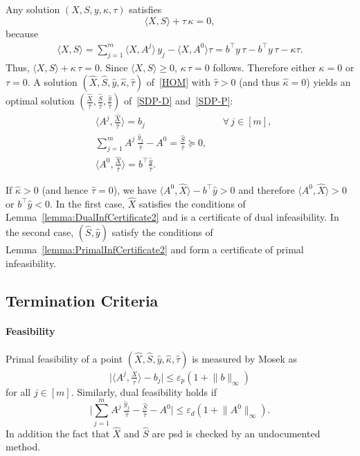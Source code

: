 \documentclass[10pt, a4paper]{article}
\newcommand{\abs}[1]{\lvert{#1}\rvert}
\newcommand{\norm}[1]{\lVert{#1}\rVert}
\newcommand{\skal}[2]{\langle{#1},{#2}\rangle}
\newcommand{\T}{^{\top}}
\begin{document}
Any solution $(X,S,y,\kappa,\tau)$ satisfies
\[
\skal{X}{S} + \tau\, \kappa = 0,
\]
because
\begin{align*}
  \skal{X}{S} = \sum_{j=1}^m \skal{X}{A^j}\, y_j - \skal{X}{A^0} \tau = b\T y\,\tau - b\T y\,\tau - \kappa \tau.
\end{align*}
Thus, $\skal{X}{S} + \kappa\, \tau = 0$. Since $\skal{X}{S} \geq 0$,
$\kappa \, \tau = 0$ follows. Therefore either $\kappa = 0$ or $\tau = 0$.
A solution $(\hat{X},\hat{S},\hat{y},\hat{\kappa},\hat{\tau})$
of~\eqref{HOM} with $\hat{\tau} > 0$ (and thus $\hat{\kappa} = 0$) yields
an optimal solution
$(\frac{\hat{X}}{\hat{\tau}}, \frac{\hat{S}}{\hat{\tau}},
\frac{\hat{y}}{\hat{\tau}})$ of~\eqref{SDP-D} and~\eqref{SDP-P}:
\begin{align*}
  & \skal{A^j}{\tfrac{\hat{X}}{\hat{\tau}}} = b_j && \forall \, j \in [m],\\
  & \sum_{j=1}^m A^j\, \tfrac{\hat{y}_j}{\hat{\tau}} -
    A^0 = \tfrac{\hat{S}}{\hat{\tau}} \succeq 0, \\
  & \skal{A^0}{\tfrac{\hat{X}}{\hat{\tau}}} = b\T \tfrac{\hat{y}}{\hat{\tau}}.
\end{align*}

If $\hat{\kappa} > 0$ (and hence $\hat{\tau} = 0$), we have
$\skal{A^0}{\hat{X}} - b\T \hat{y} > 0$ and therefore
$\skal{A^0}{\hat{X}} > 0$ or $b\T \hat{y} < 0$. In the first case,
$\hat{X}$ satisfies the conditions of Lemma~\ref{lemma:DualInfCertificate2}
and is a certificate of dual infeasibility. In the second case,
$(\hat{S},\hat{y})$ satisfy the conditions of
Lemma~\ref{lemma:PrimalInfCertificate2} and form a certificate of primal
infeasibility.


\subsection{Termination Criteria}

\paragraph{Feasibility}

Primal feasibility of a point
$(\hat{X},\hat{S},\hat{y},\hat{\kappa},\hat{\tau})$ is measured by Mosek as
\[
\abs{\skal{A^j}{\tfrac{\hat{X}}{\hat{\tau}}} - b_j}
\leq \varepsilon_p (1 + \norm{b}_\infty)
\]
for all $j \in [m]$. Similarly, dual feasibility holds if
\[
\Big\lvert\sum_{j=1}^m A^j\, \tfrac{\hat{y}_j}{\hat{\tau}} - \tfrac{\hat{S}}{\hat{\tau}} - A^0\Big\rvert
\leq \varepsilon_d (1 + \norm{A^0}_\infty).
\]
In addition the fact that $\hat{X}$ and $\hat{S}$ are psd is checked by an
undocumented method.
\end{document}
